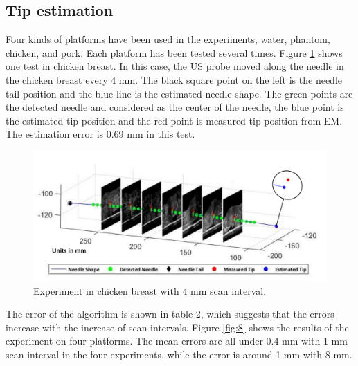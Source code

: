 \documentclass[journal,article,submit,moreauthors,pdftex]{Definitions/mdpi}
\begin{document}
\subsection{Tip estimation}
Four kinds of platforms have been used in the experiments, water, phantom, chicken, and pork. Each platform has been tested several times. Figure \ref{fig:7} shows one test in chicken breast. In this case, the US probe moved along the needle in the chicken breast every 4 mm. The black square point on the left is the needle tail position and the blue line is the estimated needle shape. The green points are the detected needle and considered as the center of the needle, the blue point is the estimated tip position and the red point is measured tip position from EM. The estimation error is 0.69 mm in this test.
\begin{figure}[H]
	\centering
	\includegraphics[width=\textwidth]{figures/2/f7.pdf}
	\captionsetup{width=14 cm,justification=centering}
	\caption{Experiment in chicken breast with 4 mm scan interval.}
	\label{fig:7}
\end{figure}

The error of the algorithm is shown in table 2, which suggests that the errors increase with the increase of scan intervals. Figure \ref{fig:8} shows the results of the experiment on four platforms. The mean errors are all under 0.4 mm with 1 mm scan interval in the four experiments, while the error is around 1 mm with 8 mm.
\end{document}
